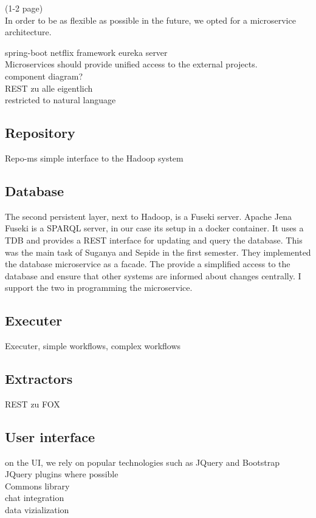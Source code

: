 (1-2 page)\\
In order to be as flexible as possible in the future, we opted for a microservice architecture. 

spring-boot netflix framework eureka server\\
Microservices should provide unified access to the external projects.\\
component diagram?\\
REST zu alle eigentlich\\
restricted to natural language\\

\subsection{Repository}
Repo-ms simple interface to the Hadoop system\\

\subsection{Database}
The second persistent layer, next to Hadoop, is a Fuseki server. Apache Jena Fuseki is a SPARQL server, in our case its setup in a docker container. It uses a TDB and provides a REST interface for updating and query the database. This was the main task of Suganya and Sepide in the first semester. They implemented the database microservice as a facade. The provide a simplified access to the database and ensure that other systems are informed about changes centrally. I support the two in programming the microservice.

\subsection{Executer}
Executer, simple workflows, complex workflows\\

\subsection{Extractors}
REST zu FOX\\

\subsection{User interface}
on the UI, we rely on popular technologies such as JQuery and Bootstrap\\
JQuery plugins where possible\\
Commons library\\
chat integration\\
data vizialization\\

